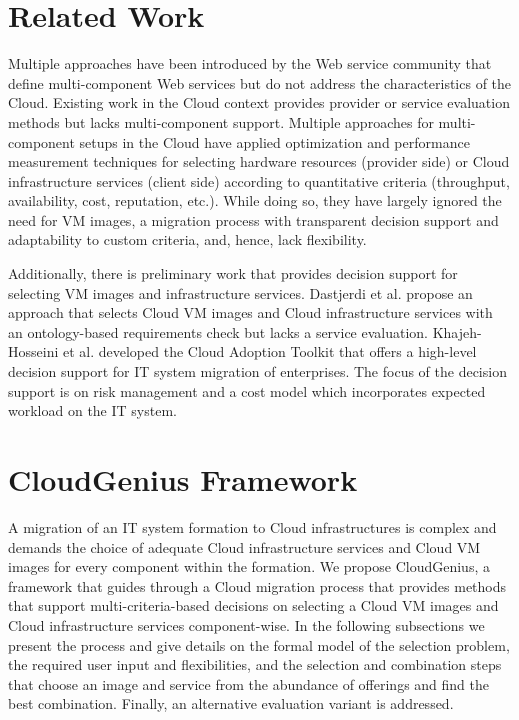\documentclass[10pt]{article}
\begin{document}
\section{Related Work}\label{related}

Multiple approaches have been introduced by the Web service community that define multi-component Web services \cite{hamadi2003petri}\cite{zhang2008colored} but do not address the characteristics of the Cloud.
Existing work in the Cloud context provides provider or service evaluation methods but lacks multi-component support\cite{chan2010ranking}.
Multiple approaches for multi-component setups in the Cloud have applied optimization \cite{ye2011genetic}\cite{SPE:SPE1032}\cite{Goudarzi_Pedram}\cite{hajjat2010cloudward} and performance measurement techniques \cite{li2010cloudcmp} for selecting hardware resources (provider side) or Cloud infrastructure services (client side) according to quantitative criteria (throughput, availability, cost, reputation, etc.). While doing so, they have largely ignored the need for VM images, a migration process with transparent decision support and adaptability to custom criteria, and, hence, lack flexibility.

Additionally, there is preliminary work that provides decision support for selecting VM images and infrastructure services. Dastjerdi et al. \cite{dastjerdi2010effective} propose an approach that selects Cloud VM images and Cloud infrastructure services with an ontology-based requirements check but lacks a service evaluation.
Khajeh-Hosseini et al. \cite{khajeh2010cloud} \cite{khajeh2011decision} developed the Cloud Adoption Toolkit that offers a high-level decision support for IT system migration of enterprises. The focus of the decision support is on risk management and a cost model which incorporates expected workload on the IT system.

\section{CloudGenius Framework}\label{framework}

A migration of an IT system formation to Cloud infrastructures is complex and demands the choice of adequate Cloud infrastructure services and Cloud VM images for every component within the formation. We propose CloudGenius, a framework that guides through a Cloud migration process that provides methods that support multi-criteria-based decisions on selecting a Cloud VM images and Cloud infrastructure services component-wise. 
In the following subsections we present the process and give details on the formal model of the selection problem, the required user input and flexibilities, and the selection and combination steps that choose an image and service from the abundance of offerings and find the best combination. Finally, an alternative evaluation variant is addressed.
\end{document}
